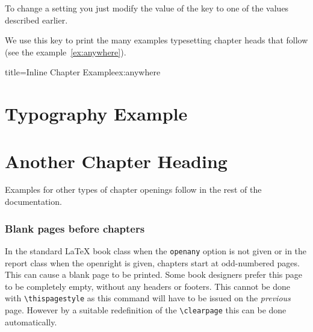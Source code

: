 
To change a setting you just modify the value of the key  to one of the values described earlier. 

\begin{dispListing}
\end{dispListing}
 
We use this key to print the many examples typesetting chapter heads that follow (see the example~\ref{ex:anywhere}).  


\begin{texexample}{title=Inline Chapter Example}{ex:anywhere}
\lorem
\chapter{Typography Example}
\lorem
\chapter{Another Chapter Heading}
\lorem
\end{texexample}


\addtocounter{chapter}{-1}

Examples for other types of chapter openings follow in the rest of the documentation.

\subsection{Blank pages before chapters}

In the standard LaTeX book class when the \texttt{openany} option is not given or in the report class when the openright is given, chapters start at odd-numbered pages. This can cause a blank page to be printed. Some book designers prefer this page to be completely empty, without any headers or footers. This cannot be done with \lstinline{\thispagestyle} as this command will have to be issued on the \textit{previous} page. However by a suitable redefinition of the
\lstinline{\clearpage} this can be done automatically.
\medskip

